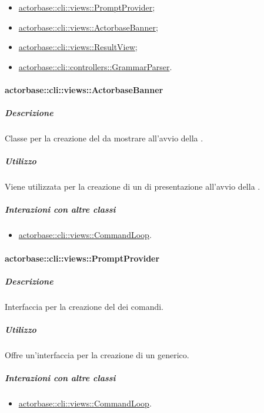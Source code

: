 \documentclass{scalatekids-article}
\begin{document}
\begin{itemize}
\item \hyperref[sec:actorbase::cli::views::PromptProvider]{actorbase::cli::views::PromptProvider};
\item \hyperref[sec:actorbase::cli::views::ActorbaseBanner]{actorbase::cli::views::ActorbaseBanner};
\item \hyperref[sec:actorbase::cli::views::ResultView]{actorbase::cli::views::ResultView};
\item \hyperref[sec:actorbase::cli::controllers::GrammarParser]{actorbase::cli::controllers::GrammarParser}.
\end{itemize}

\paragraph{actorbase::cli::views::ActorbaseBanner}
\label{sec:actorbase::cli::views::ActorbaseBanner}

\subparagraph{Descrizione}

Classe per la creazione del  da mostrare all'avvio della
.

\subparagraph{Utilizzo}

Viene utilizzata per la creazione di un  di presentazione
all'avvio della .

\subparagraph{Interazioni con altre classi}

\begin{itemize}
\item \hyperref[sec:actorbase::cli::views::CommandLoop]{actorbase::cli::views::CommandLoop}.
\end{itemize}

\paragraph{actorbase::cli::views::PromptProvider}
\label{sec:actorbase::cli::views::PromptProvider}

\subparagraph{Descrizione}

Interfaccia per la creazione del  dei comandi.

\subparagraph{Utilizzo}

Offre un'interfaccia per la creazione di un  generico.

\subparagraph{Interazioni con altre classi}

\begin{itemize}
\item \hyperref[sec:actorbase::cli::views::CommandLoop]{actorbase::cli::views::CommandLoop}.
\end{itemize}
\end{document}
